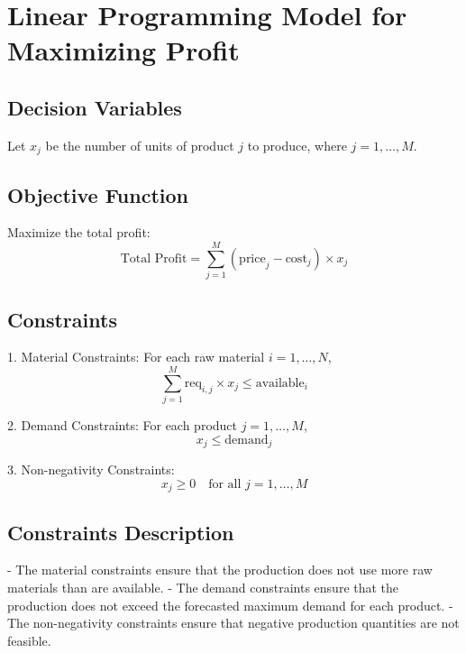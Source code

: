 \documentclass{article}
\begin{document}
\section*{Linear Programming Model for Maximizing Profit}

\subsection*{Decision Variables}
Let \( x_j \) be the number of units of product \( j \) to produce, where \( j = 1, \ldots, M \).

\subsection*{Objective Function}
Maximize the total profit:
\[
\text{Total Profit} = \sum_{j=1}^{M} ( \text{price}_j - \text{cost}_j ) \times x_j
\]

\subsection*{Constraints}

1. Material Constraints: For each raw material \( i = 1, \ldots, N \),
   \[
   \sum_{j=1}^{M} \text{req}_{i,j} \times x_j \leq \text{available}_i
   \]

2. Demand Constraints: For each product \( j = 1, \ldots, M \),
   \[
   x_j \leq \text{demand}_j
   \]

3. Non-negativity Constraints:
   \[
   x_j \geq 0 \quad \text{for all } j = 1, \ldots, M
   \]

\subsection*{Constraints Description}
- The material constraints ensure that the production does not use more raw materials than are available.
- The demand constraints ensure that the production does not exceed the forecasted maximum demand for each product.
- The non-negativity constraints ensure that negative production quantities are not feasible.
\end{document}
